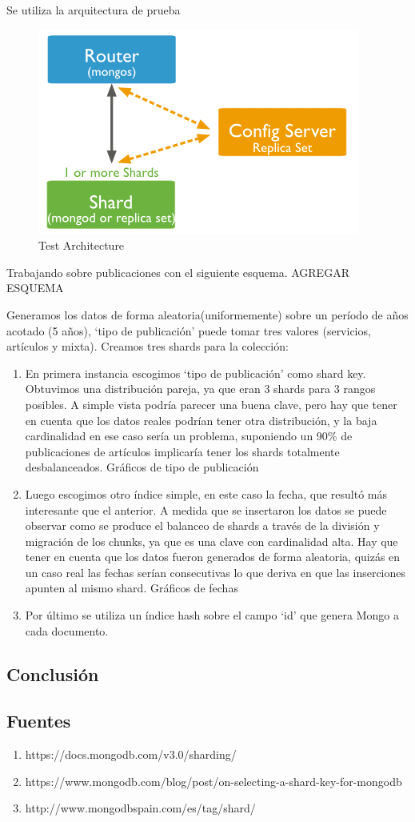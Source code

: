 Se utiliza la arquitectura de prueba
\begin{figure}[h!]
 \centering
 \includegraphics[scale=0.5,keepaspectratio=true]{./sharded-cluster-test-architecture.png}
 \caption{Test Architecture}
\end{figure}

Trabajando sobre publicaciones con el siguiente esquema.
{AGREGAR ESQUEMA}

Generamos los datos de forma aleatoria(uniformemente) sobre un período de años acotado (5 años), `tipo de publicación' puede tomar tres valores
(servicios, artículos y mixta).
Creamos tres shards para la colección:

\begin{enumerate}
\item 
En primera instancia escogimos `tipo de publicación' como shard key. Obtuvimos una distribución pareja, ya que eran 3 shards
para 3 rangos posibles. A simple vista podría parecer una buena clave, pero hay que tener en cuenta que los datos reales
podrían tener otra distribución, y la baja cardinalidad en ese caso sería un problema, suponiendo un 90\% de publicaciones de artículos 
implicaría tener los shards totalmente desbalanceados.
{Gráficos de tipo de publicación}
\item 
Luego escogimos otro índice simple, en este caso la fecha, que resultó más interesante que el anterior. A medida que se insertaron los 
datos se puede observar como se produce el balanceo de shards a través de la división y migración de los chunks, ya que es una clave con 
cardinalidad alta. Hay que tener en cuenta que los datos fueron generados de forma aleatoria, quizás en un caso real las fechas serían 
consecutivas lo que deriva en que las inserciones apunten al mismo shard.
{Gráficos de fechas}
\item 
Por último se utiliza un índice hash sobre el campo `id' que genera Mongo a cada documento.\end{enumerate}


\subsection{Conclusión}
\subsection{Fuentes} 
\begin{enumerate}
\item 
https://docs.mongodb.com/v3.0/sharding/
\item 
https://www.mongodb.com/blog/post/on-selecting-a-shard-key-for-mongodb
\item 
http://www.mongodbspain.com/es/tag/shard/\end{enumerate}



